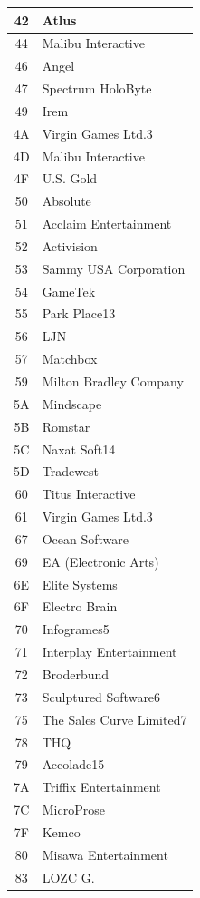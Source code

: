 \begin{longtable}{|c|l|}
42 & Atlus \\\hline
44 & Malibu Interactive \\\hline
46 & Angel \\\hline
47 & Spectrum HoloByte \\\hline
49 & Irem \\\hline
4A & Virgin Games Ltd.3 \\\hline
4D & Malibu Interactive \\\hline
4F & U.S. Gold \\\hline
50 & Absolute \\\hline
51 & Acclaim Entertainment \\\hline
52 & Activision \\\hline
53 & Sammy USA Corporation \\\hline
54 & GameTek \\\hline
55 & Park Place13 \\\hline
56 & LJN \\\hline
57 & Matchbox \\\hline
59 & Milton Bradley Company \\\hline
5A & Mindscape \\\hline
5B & Romstar \\\hline
5C & Naxat Soft14 \\\hline
5D & Tradewest \\\hline
60 & Titus Interactive \\\hline
61 & Virgin Games Ltd.3 \\\hline
67 & Ocean Software \\\hline
69 & EA (Electronic Arts) \\\hline
6E & Elite Systems \\\hline
6F & Electro Brain \\\hline
70 & Infogrames5 \\\hline
71 & Interplay Entertainment \\\hline
72 & Broderbund \\\hline
73 & Sculptured Software6 \\\hline
75 & The Sales Curve Limited7 \\\hline
78 & THQ \\\hline
79 & Accolade15 \\\hline
7A & Triffix Entertainment \\\hline
7C & MicroProse \\\hline
7F & Kemco \\\hline
80 & Misawa Entertainment \\\hline
83 & LOZC G. \\\hline

\end{longtable}
